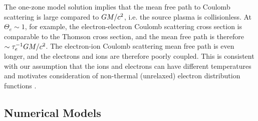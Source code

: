 The one-zone model solution implies that the mean free path to Coulomb scattering is large compared to $GM/c^2$, i.e. the source plasma is collisionless.
At $\Theta_e \sim 1$, for example, the electron-electron Coulomb scattering cross section is comparable to the Thomson cross section, and the mean free path is therefore $\sim \tau_e^{-1} GM/c^2$.
The electron-ion Coulomb scattering mean free path is even longer, and the electrons and ions are therefore poorly coupled.
This is consistent with our assumption that the ions and electrons can have different temperatures  \citep{1976ApJ...204..187S,1977ApJ...214..840I, 1982Natur.295...17R} and motivates consideration of non-thermal (unrelaxed) electron distribution functions \citep[see][]{2000ApJ...541..234O, 2009ApJ...701..521C, 2014A&A...570A...7M, 2018A&A...612A..34D, 2021NatAs.tmp..218C, Chatterjee2021, 2021arXiv211203933E, Scepi2021, 2022A&A...660A.107F}.

\subsection{Numerical Models}

